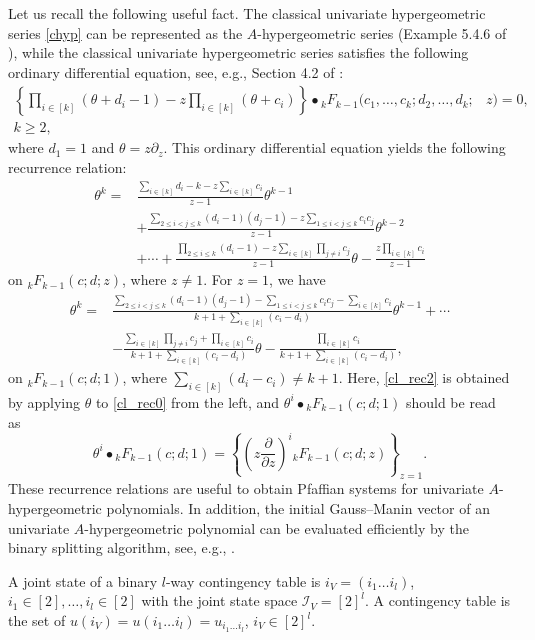 \documentclass[a4paper,12pt]{article}
\theoremstyle{plain}
\theoremstyle{remark}
\begin{document}
Let us recall the following useful fact. The classical univariate
hypergeometric series \eqref{chyp} can be represented as
the $A$-hypergeometric series (Example 5.4.6 of \cite{SST00}),
while the classical univariate hypergeometric series satisfies
the following ordinary differential equation, see, e.g.,
Section 4.2 of \cite{Erd53}:
\begin{align}
  \left\{\prod_{i\in[k]}(\theta+d_i-1)-z\prod_{i\in[k]}(\theta+c_i)
  \right\}\bullet {}_kF_{k-1}(c_1,\ldots,c_k;d_2,\ldots,d_k;&z)=0,
  \nonumber\\
  k\ge 2,&\label{cl_rec0}
\end{align}
where $d_1=1$ and $\theta=z\partial_z$. This ordinary differential
equation yields the following recurrence relation:
\begin{align}
  \theta^k=&\frac{\sum_{i\in[k]}d_i-k-z\sum_{i\in[k]}c_i}{z-1}
  \theta^{k-1}\nonumber\\
  &+
  \frac{\sum_{2\le i<j\le k}(d_i-1)(d_j-1)-z\sum_{1\le i<j\le k}
  c_ic_j}{z-1}\theta^{k-2}\nonumber\\
  &+\cdots
  +\frac{\prod_{2\le i\le k}(d_i-1)-z\sum_{i\in[k]}\prod_{j\neq i}c_j}
  {z-1}\theta-\frac{z\prod_{i\in[k]}c_i}{z-1}
  \label{cl_rec1}
\end{align} 
on ${}_kF_{k-1}(c;d;z)$, where $z\neq 1$. For $z=1$, we have
\begin{align}
  \theta^{k}=&
  \frac{\sum_{2\le i<j\le k}(d_i-1)(d_j-1)-\sum_{1\le i<j\le k}c_ic_j-\sum_{i\in[k]}c_i}{k+1+\sum_{i\in[k]}(c_i-d_i)}\theta^{k-1}+\cdots\nonumber\\
  &-\frac{\sum_{i\in[k]}\prod_{j\neq i}c_j+\prod_{i\in[k]}c_i}
  {k+1+\sum_{i\in[k]}(c_i-d_i)}\theta
  -\frac{\prod_{i\in[k]}c_i}{k+1+\sum_{i\in[k]}(c_i-d_i)},
  \label{cl_rec2}
\end{align} 
on ${}_kF_{k-1}(c;d;1)$, where $\sum_{i\in[k]}(d_i-c_i)\neq k+1$.
Here, \eqref{cl_rec2} is obtained by applying $\theta$ to
\eqref{cl_rec0} from the left, and $\theta^i \bullet {}_kF_{k-1}(c;d;1)$
should be read as
\[
  \theta^i \bullet {}_kF_{k-1}(c;d;1)=
  \left\{\left(z\frac{\partial}{\partial z}\right)^i{}_kF_{k-1}(c;d;z)
  \right\}_{z=1}.
\]
These recurrence relations are useful to obtain Pfaffian systems
for univariate $A$-hypergeometric polynomials.
In addition, the initial Gauss--Manin vector of an univariate
$A$-hypergeometric polynomial can be evaluated efficiently by
the binary splitting algorithm, see, e.g., \cite{Mez10}.

A joint state of a binary $l$-way contingency table is
$i_V=(i_1\ldots i_l)$, $i_1\in[2],\ldots,i_l\in[2]$ with the joint
state space $\mathcal{I}_V=[2]^l$. A contingency table is
the set of $u(i_V)=u(i_1\ldots i_l)=u_{i_1\ldots i_l}$, $i_V\in[2]^l$.
  
\end{document}
